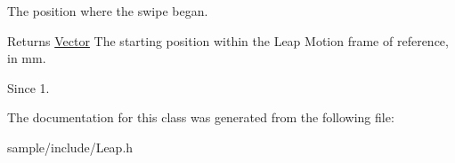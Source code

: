 The position where the swipe began.


\begin{DoxyCodeInclude}
\end{DoxyCodeInclude}


\begin{DoxyReturn}{Returns}
\hyperlink{struct_leap_1_1_vector}{Vector} The starting position within the Leap Motion frame of reference, in mm. 
\end{DoxyReturn}
\begin{DoxySince}{Since}
1. 
\end{DoxySince}


The documentation for this class was generated from the following file\+:\begin{DoxyCompactItemize}
\item 
sample/include/Leap.\+h\end{DoxyCompactItemize}
